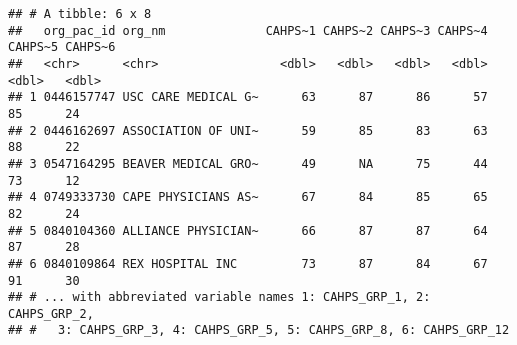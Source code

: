 \documentclass[
]{article}
\begin{document}
\begin{verbatim}
## # A tibble: 6 x 8
##   org_pac_id org_nm              CAHPS~1 CAHPS~2 CAHPS~3 CAHPS~4 CAHPS~5 CAHPS~6
##   <chr>      <chr>                 <dbl>   <dbl>   <dbl>   <dbl>   <dbl>   <dbl>
## 1 0446157747 USC CARE MEDICAL G~      63      87      86      57      85      24
## 2 0446162697 ASSOCIATION OF UNI~      59      85      83      63      88      22
## 3 0547164295 BEAVER MEDICAL GRO~      49      NA      75      44      73      12
## 4 0749333730 CAPE PHYSICIANS AS~      67      84      85      65      82      24
## 5 0840104360 ALLIANCE PHYSICIAN~      66      87      87      64      87      28
## 6 0840109864 REX HOSPITAL INC         73      87      84      67      91      30
## # ... with abbreviated variable names 1: CAHPS_GRP_1, 2: CAHPS_GRP_2,
## #   3: CAHPS_GRP_3, 4: CAHPS_GRP_5, 5: CAHPS_GRP_8, 6: CAHPS_GRP_12
\end{verbatim}
\end{document}
